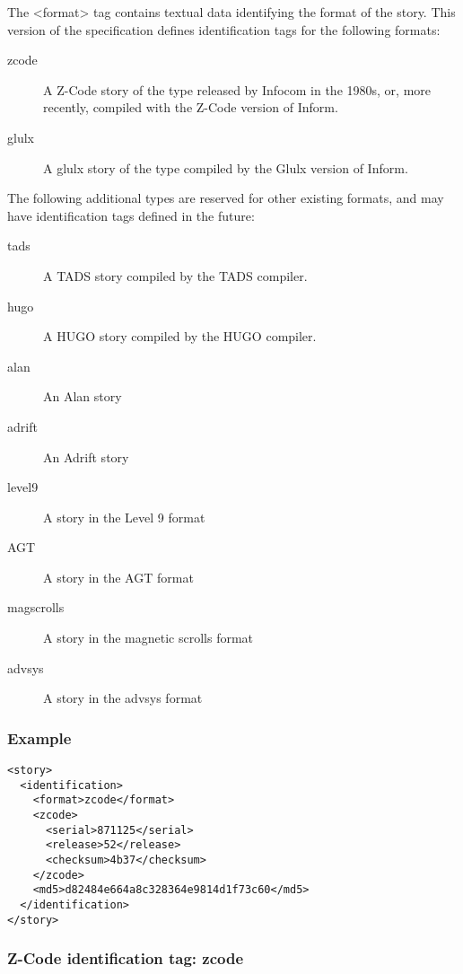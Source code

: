 \documentclass[a4paper,11pt]{article}
\begin{document}
The <format> tag contains textual data identifying the format of the story. This version
of the specification defines identification tags for the following formats:

\begin{description}
\item[zcode] A Z-Code story of the type released by Infocom in the 1980s, or, more
recently, compiled with the Z-Code version of Inform.
\item[glulx] A glulx story of the type compiled by the Glulx version of Inform.
\end{description}

The following additional types are reserved for other existing formats, and may have
identification tags defined in the future:

\begin{description}
\item[tads] A TADS story compiled by the TADS compiler.
\item[hugo] A HUGO story compiled by the HUGO compiler.
\item[alan] An Alan story
\item[adrift] An Adrift story
\item[level9] A story in the Level 9 format
\item[AGT] A story in the AGT format
\item[magscrolls] A story in the magnetic scrolls format
\item[advsys] A story in the advsys format
\end{description}

\subsubsection{Example}

\begin{example}
\begin{verbatim}
<story>
  <identification>
    <format>zcode</format>
    <zcode>
      <serial>871125</serial>
      <release>52</release>
      <checksum>4b37</checksum>
    </zcode>
    <md5>d82484e664a8c328364e9814d1f73c60</md5>
  </identification>
</story>
\end{verbatim}
\end{example}

\subsubsection{Z-Code identification tag: zcode}
\end{document}
